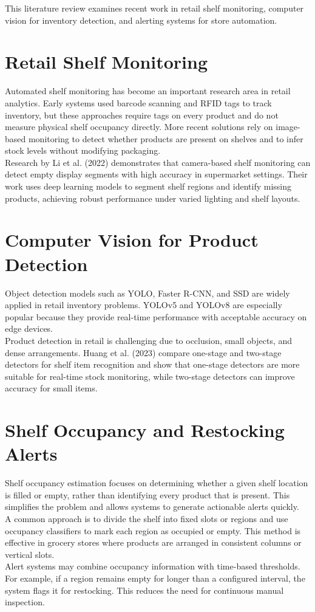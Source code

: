 This literature review examines recent work in retail shelf monitoring, computer vision for inventory detection, and alerting systems for store automation.

\section{Retail Shelf Monitoring}

Automated shelf monitoring has become an important research area in retail analytics. Early systems used barcode scanning and RFID tags to track inventory, but these approaches require tags on every product and do not measure physical shelf occupancy directly. More recent solutions rely on image-based monitoring to detect whether products are present on shelves and to infer stock levels without modifying packaging.
\\
Research by Li et al. (2022) demonstrates that camera-based shelf monitoring can detect empty display segments with high accuracy in supermarket settings. Their work uses deep learning models to segment shelf regions and identify missing products, achieving robust performance under varied lighting and shelf layouts.

\section{Computer Vision for Product Detection}

Object detection models such as YOLO, Faster R-CNN, and SSD are widely applied in retail inventory problems. YOLOv5 and YOLOv8 are especially popular because they provide real-time performance with acceptable accuracy on edge devices.
\\
Product detection in retail is challenging due to occlusion, small objects, and dense arrangements. Huang et al. (2023) compare one-stage and two-stage detectors for shelf item recognition and show that one-stage detectors are more suitable for real-time stock monitoring, while two-stage detectors can improve accuracy for small items.

\section{Shelf Occupancy and Restocking Alerts}

Shelf occupancy estimation focuses on determining whether a given shelf location is filled or empty, rather than identifying every product that is present. This simplifies the problem and allows systems to generate actionable alerts quickly.
\\
A common approach is to divide the shelf into fixed slots or regions and use occupancy classifiers to mark each region as occupied or empty. This method is effective in grocery stores where products are arranged in consistent columns or vertical slots.
\\
Alert systems may combine occupancy information with time-based thresholds. For example, if a region remains empty for longer than a configured interval, the system flags it for restocking. This reduces the need for continuous manual inspection.

